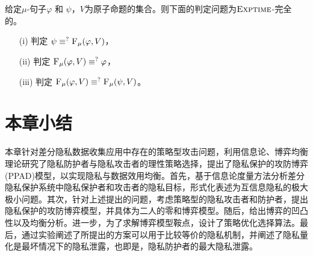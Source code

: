 \begin{corollary}\label{chapter06:cor:equiv}
	给定$\mu$-句子$\varphi$ 和 $\psi$，$V$为原子命题的集合。则下面的判定问题为$\textsc{Exptime}$-完全的。
	\begin{itemize}
		\item[(i)] 判定 $\psi \equiv^?{\textsc{F}_{\textsc{$\mu$}}}(\varphi, V)$，
		\item[(ii)] 判定 ${\textsc{F}_{\textsc{$\mu$}}}(\varphi, V) \equiv^? \varphi$，
		\item[(iii)] 判定 ${\textsc{F}_{\textsc{$\mu$}}}(\varphi, V) \equiv^? {\textsc{F}_{\textsc{$\mu$}}}(\psi, V)$。
	\end{itemize}
\end{corollary}
\section{本章小结}\label{sec:chapter06-conclusion}

本章针对差分隐私数据收集应用中存在的策略型攻击问题，利用信息论、博弈均衡理论研究了隐私防护者与隐私攻击者的理性策略选择，提出了隐私保护的攻防博弈(PPAD)模型，以实现隐私与数据效用均衡。首先，基于信息论度量方法分析差分隐私保护系统中隐私保护者和攻击者的隐私目标，形式化表述为互信息隐私的极大极小问题。其次，针对上述提出的问题，考虑策略型的隐私攻击者和防护者，提出隐私保护的攻防博弈模型，并具体为二人的零和博弈模型。随后，给出博弈的凹凸性以及均衡分析。进一步，为了求解博弈模型鞍点，设计了策略优化选择算法。最后，通过实验阐述了所提出的方案可以用于比较等价的隐私机制，并阐述了隐私量化是最坏情况下的隐私泄露，也即是，隐私防护者的最大隐私泄露。
